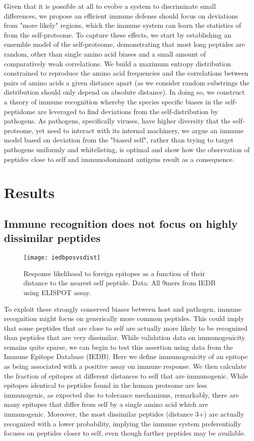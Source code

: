 \documentclass[superscriptaddress,twocolumn,pre]{revtex4}
\newcommand{\<}{\langle}
\renewcommand{\>}{\rangle}
\begin{document}
Given that it is possible at all to evolve a system to discriminate small differences, we propose an efficient immune defense should focus on deviations from "more likely" regions, which the immune system can learn the statistics of from the self-proteome. To capture these effects, we start by establishing an ensemble model of the self-proteome, demonstrating that most long peptides are random, other than single amino acid biases and a small amount of comparatively weak correlations. We build a maximum entropy distribution constrained to reproduce the amino acid frequencies and the correlations between pairs of amino acids a given distance apart (as we consider random substrings the distribution should only depend on absolute distance).  In doing so, we construct a theory of immune recognition whereby the species specific biases in the self-peptidome are leveraged to find deviations from the self-distribution by pathogens. As pathogens, specifically viruses, have higher diversity that the self-proteome, yet need to interact with its internal machinery, we argue an immune model based on deviation from the "biased self", rather than trying to target pathogens uniformly and whitelisting, is optimal and show how the observation of peptides close to self and immunodominant antigens result as a consequence. 

\section{Results}

\subsection{Immune recognition does not focus on highly dissimilar peptides}

\begin{figure}
    \texttt{[image: iedbposvsdist]}
    \caption{Response likelihood to foreign epitopes as a function of their distance to the nearest self peptide. Data: All 9mers from IEDB using ELISPOT assay.
    \label{figiedbposvsdist}
    }
\end{figure}

To exploit these strongly conserved biases between host and pathogen, immune recognition might focus on generically more common peptides. This could imply that some peptides that are close to self are actually more likely to be recognized than peptides that are very dissimilar. While validation data on immunogenicity remains quite sparse, we can begin to test this assertion using data from the Immune Epitope Database (IEDB). Here we define immunogenicity of an epitope as being associated with a positive assay on immune response. We then calculate the fraction of epitopes at different distances to self that are immunogenic. While epitopes identical to peptides found in the human proteome are less immunogenic, as expected due to tolerance mechanisms, remarkably, there are many epitopes that differ from self by a single amino acid which are immunogenic. Moreover, the most dissimilar peptides (distance 3+) are actually recognized with a lower probability, implying the immune system preferentially focuses on peptides closer to self, even though farther peptides may be available.
\end{document}
